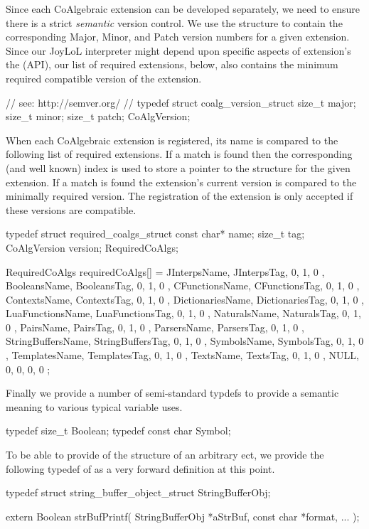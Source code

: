 Since each CoAlgebraic extension can be developed separately, we need to 
ensure there is a strict \emph{semantic} version control. We use the 
 structure to contain the corresponding Major, Minor, 
and Patch version numbers for a given extension. Since our JoyLoL 
interpreter might depend upon specific aspects of extension's the 
 (API), our list of required 
extensions, below, also contains the minimum required compatible version 
of the extension. 

\startCHeader
// see: http://semver.org/
//
typedef struct coalg_version_struct {
  size_t major;
  size_t minor;
  size_t patch;
} CoAlgVersion;
\stopCHeader

When each CoAlgebraic extension is registered, its name is compared to the 
following list of required extensions. If a match is found then the 
corresponding (and well known) index is used to store a pointer to the 
 structure for the given extension. If a match is found 
the extension's current version is compared to the minimally required 
version. The registration of the extension is only accepted if these 
versions are compatible. 

\startCCode
typedef struct required_coalgs_struct {
  const char*  name;
  size_t       tag;
  CoAlgVersion version;
} RequiredCoAlgs;

RequiredCoAlgs requiredCoAlgs[] = {
  { JInterpsName,      JInterpsTag,      {0, 1, 0 }},
  { BooleansName,      BooleansTag,      {0, 1, 0 }},
  { CFunctionsName,    CFunctionsTag,    {0, 1, 0 }},
  { ContextsName,      ContextsTag,      {0, 1, 0 }},
  { DictionariesName,  DictionariesTag,  {0, 1, 0 }},
  { LuaFunctionsName,  LuaFunctionsTag,  {0, 1, 0 }},
  { NaturalsName,      NaturalsTag,      {0, 1, 0 }},
  { PairsName,         PairsTag,         {0, 1, 0 }},
  { ParsersName,       ParsersTag,       {0, 1, 0 }},
  { StringBuffersName, StringBuffersTag, {0, 1, 0 }},
  { SymbolsName,       SymbolsTag,       {0, 1, 0 }},
  { TemplatesName,     TemplatesTag,     {0, 1, 0 }},
  { TextsName,         TextsTag,         {0, 1, 0 }},
  { NULL,              0,                {0, 0, 0 }}
};
\stopCCode

Finally we provide a number of semi-standard typdefs to provide a semantic 
meaning to various typical variable uses. 

\startCHeader
typedef size_t     Boolean;
typedef const char Symbol;
\stopCHeader

To be able to provide  of the structure of an arbitrary 
ect, we provide the following typedef of 
 as a very forward definition at this point. 

\startCHeader
typedef struct string_buffer_object_struct StringBufferObj;

extern Boolean strBufPrintf(
  StringBufferObj   *aStrBuf,
  const char        *format, 
  ...
);
\stopCHeader